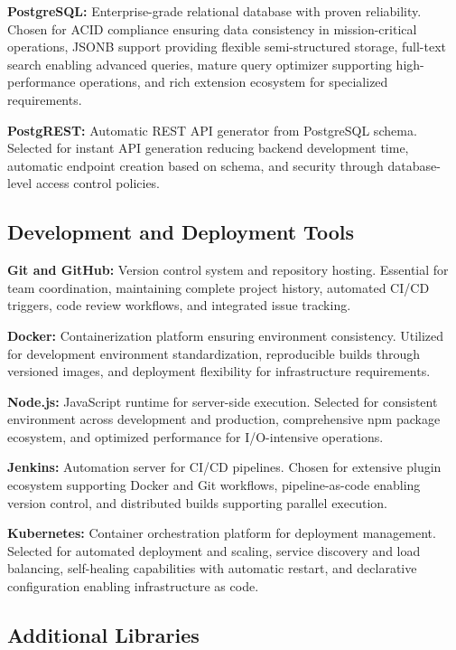 \textbf{PostgreSQL:} Enterprise-grade relational database with proven reliability. Chosen for ACID compliance ensuring data consistency in mission-critical operations, JSONB support providing flexible semi-structured storage, full-text search enabling advanced queries, mature query optimizer supporting high-performance operations, and rich extension ecosystem for specialized requirements.

\textbf{PostgREST:} Automatic REST API generator from PostgreSQL schema. Selected for instant API generation reducing backend development time, automatic endpoint creation based on schema, and security through database-level access control policies.

\subsection{Development and Deployment Tools}

\textbf{Git and GitHub:} Version control system and repository hosting. Essential for team coordination, maintaining complete project history, automated CI/CD triggers, code review workflows, and integrated issue tracking.

\textbf{Docker:} Containerization platform ensuring environment consistency. Utilized for development environment standardization, reproducible builds through versioned images, and deployment flexibility for infrastructure requirements.

\textbf{Node.js:} JavaScript runtime for server-side execution. Selected for consistent environment across development and production, comprehensive npm package ecosystem, and optimized performance for I/O-intensive operations.

\textbf{Jenkins:} Automation server for CI/CD pipelines. Chosen for extensive plugin ecosystem supporting Docker and Git workflows, pipeline-as-code enabling version control, and distributed builds supporting parallel execution.

\textbf{Kubernetes:} Container orchestration platform for deployment management. Selected for automated deployment and scaling, service discovery and load balancing, self-healing capabilities with automatic restart, and declarative configuration enabling infrastructure as code.

\subsection{Additional Libraries}

